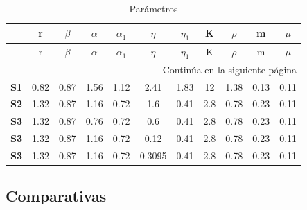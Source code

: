 \documentclass{wscpaperproc}
\theoremstyle{wsc}
\begin{document}
\begin{longtable}{rcccccccccc}
	\caption{Par\'ametros\label{tab:first}} \\
	\hline
	& r    & $\beta$ & $\alpha$ & $\alpha_1$ & $\eta$ & $\eta_1$ & K   & $\rho$ & m    & $\mu$ \\ \hline
	\endfirsthead
	\hline
	& r    & $\beta$ & $\alpha$ & $\alpha_1$ & $\eta$ & $\eta_1$ & K   & $\rho$ & m    & $\mu$ \\ \hline
	\endhead
	\hline
	\multicolumn{11}{|r|}{{Continúa en la siguiente página}} \\ \hline
	\endfoot
	\hline
	\endlastfoot
	\textbf{S1} & 0.82 & 0.87    & 1.56     & 1.12       & 2.41   & 1.83     & 12  & 1.38   & 0.13 & 0.11 \\
	\textbf{S2} & 1.32 & 0.87    & 1.16     & 0.72       & 1.6    & 0.41     & 2.8 & 0.78   & 0.23 & 0.11 \\
	\textbf{S3} & 1.32 & 0.87    & 0.76     & 0.72       & 0.6    & 0.41     & 2.8 & 0.78   & 0.23 & 0.11 \\
	\textbf{S3} & 1.32 & 0.87    & 1.16     & 0.72       & 0.12   & 0.41     & 2.8 & 0.78   & 0.23 & 0.11 \\
	\textbf{S3} & 1.32 & 0.87    & 1.16     & 0.72       & 0.3095 & 0.41     & 2.8 & 0.78   & 0.23 & 0.11 \\
\end{longtable}

\subsection{Comparativas}
\end{document}
